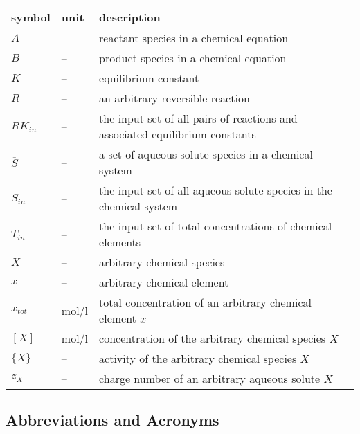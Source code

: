 \documentclass[12pt]{article}
\begin{document}
\renewcommand{\arraystretch}{1.2}
\noindent \begin{longtable*}{l l p{12cm}} \toprule
\textbf{symbol} & \textbf{unit} & \textbf{description}\\
\midrule 
$A$ & -- & reactant species in a chemical equation
\\
$B$ & -- & product species in a chemical equation
\\ 
$K$ & -- & equilibrium constant
\\ 
$R$ & -- & an arbitrary reversible reaction
\\ 
$\overline {RK}_{in}$ & -- & the input set of all pairs of reactions and 
  associated equilibrium constants 
\\ 
$\overline S$ & -- & a set of aqueous solute species in a chemical system
\\ 
$\overline S_{in}$ & -- & the input set of all aqueous solute species in 
  the chemical system
\\ 
$\overline T_{in}$ & -- & the input set of total concentrations of chemical 
  elements
\\ 
$X$ & -- & arbitrary chemical species
\\
$x$ & -- & arbitrary chemical element
\\
$x_{tot}$ & \si[per-mode=symbol] {\mole\per\litre} & total concentration of an 
  arbitrary chemical element $x$
\\
$[X]$ & \si[per-mode=symbol] {\mole\per\litre} & concentration of the arbitrary 
  chemical species $X$
\\
$\{X\}$ & -- & activity of the arbitrary chemical species $X$
\\
$z_{X}$ & -- & charge number of an arbitrary aqueous solute $X$
\\
\bottomrule
\end{longtable*}


\subsection{Abbreviations and Acronyms}
\end{document}
